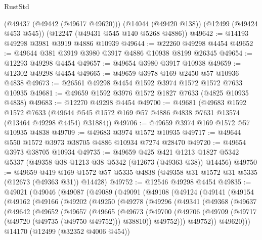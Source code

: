 \begin{lexlean}{RustStd}
\begin{coremodule}
    (@49437 (@49442 (@49617 @49620)))
    (@14044 (@49420 @138))
    (@12499 (@49424 @453 @545))
    (@12247 (@49431 @545 @140 @5268 @4886))
@49642 := @14193 @49298 @3981 @3919 @4886 @10939
@49644 := @22260 @49298 @4454
@49652 := @49644 @381 @3919 @3980 @3917 @4886 @10938 @8199 @26345
@49654 := @12293 @49298 @4454
@49657 := @49654 @3980 @3917 @10938
@49659 := @12302 @49298 @4454
@49665 := @49659 @3978 @169 @2450 @57 @10936 @4838
@49673 := @26561 @49298 @4454 @1592 @3974 @1572 @1572 @7633 @10935
@49681 := @49659 @1592 @3976 @1572 @1827 @7633 (@4825 @10935 @4838)
@49683 := @12270 @49298 @4454
@49700 := @49681
    (@49683
      @1592
      @1572
      @7633
      (@49644 @545 @1572 @169 @57 @4886 @4838 @7631 @13574 (@13464 @49298 @4454) @31884))
@49706 := @49659 @3974 @169 @1572 @57 @10935 @4838
@49709 := @49683 @3974 @1572 @10935
@49717 := @49644 @550 @1572 @3973 @38705 @4886 @10934 @7274 @28470
@49720 := @49654 @3973 @38705 @10934
@49735 := @49659
    @425
    @421
    @1213
    @1827
    @5342
    @5337
    (@49358 @38 @1213 @38 @5342 (@12673 (@49363 @38)) @14456)
@49750 := @49659
    @419
    @169
    @1572
    @57
    @5335
    @4838
    (@49358 @31 @1572 @31 @5335 (@12673 (@49363 @31)) @14428)
@49752 := @12546 @49298 @4454
@49835 := @49021
    (@49046
      (@49087
        (@49089
          (@49091
            (@49108
              (@49124
                (@49141
                  (@49154
                    (@49162
                      (@49166
                        (@49202
                          (@49250
                            (@49278
                              (@49296
                                (@49341
                                  (@49368
                                    (@49637
                                      (@49642
                                        (@49652
                                          (@49657
                                            (@49665
                                              (@49673
                                                (@49700
                                                  (@49706
                                                    (@49709
                                                      (@49717
                                                        (@49720 (@49735 (@49750 @49752)))
                                                        @38810))
                                                    @49752)))
                                              @49752))
                                          @49620)))
                                    @14170
                                    (@12499 (@32352 @4006 @454))

\end{coremodule}
\end{lexlean}
